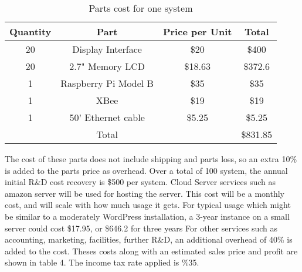 \documentclass[ppfs.tex]{template/subfiles}
\begin{document}
        \begin{table}[h!]
        	\begin{center}
        		\caption{Parts cost for one system}
        		\begin{tabular}{|c|c|c|c|}
        			\hline
        			Quantity & Part & Price per Unit & Total\\
        			\hline
        			20 & Display Interface & \$20 & \$400\\
        			\hline
        			20 & 2.7" Memory LCD & \$18.63 \cite{mouserMemoryLCD} & \$372.6\\
        			\hline
        			1 & Raspberry Pi Model B & \$35 \cite{alliedRaspberryPi} & \$35\\
        			\hline
        			1 & XBee & \$19 \cite{mouserXBEE} & \$19\\
        			\hline
        			1 & 50' Ethernet cable & \$5.25 \cite{amazonEthernetCable} & \$5.25\\
        			\hline
        			&Total&& \$831.85\\
        			\hline
        		\end{tabular}
        	\end{center}
        \end{table}
        
        The cost of these parts does not include shipping and parts loss, so an extra 10\% is added to the parts price as overhead. 
        Over a total of 100 system, the annual initial R\&D cost recovery is \$500 per system.
        Cloud Server services such as amazon server will be used for hosting the server. This cost will be a monthly cost, and will scale with how much usage it gets. For typical usage which might be similar to a moderately WordPress installation, a 3-year instance on a small server could cost \$17.95, or \$646.2 for three years \cite{wordPressEstimate}
        For other services such as accounting, marketing, facilities, further R\&D, an additional overhead of 40\% is added to the cost.
        Theses costs along with an estimated sales price and profit are shown in table 4. The income tax rate applied is \%35.
        
\end{document}

